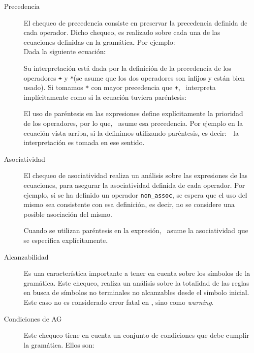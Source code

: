 \begin{description}
\item [Precedencia] El chequeo de precedencia consiste en preservar la precedencia definida de cada operador. Dicho chequeo, es realizado sobre cada una de las ecuaciones definidas en la gramática. Por ejemplo:\\ Dada la siguiente ecuación:

\begin{center}
\end{center}

Su interpretación está dada por la definición de la precedencia de los operadores \texttt{+} y \texttt{*}(se asume que los dos operadores son infijos y están bien usado). Si tomamos \texttt{*} con mayor precedencia que \texttt{+}, \maggen\ interpreta implícitamente como si la ecuación tuviera paréntesis:

\begin{center}
\end{center}

El uso de paréntesis en las expresiones define explícitamente la prioridad de los operadores, por lo que, \maggen\ asume esa precedencia. Por ejemplo en la ecuación vista arriba, si la definimos utilizando paréntesis, es decir:\  
 \ la interpretación es tomada en ese sentido.

\item [Asociatividad] El chequeo de asociatividad realiza un análisis sobre las expresiones de las ecuaciones, para asegurar la asociatividad definida de cada operador. Por ejemplo, si se ha definido un operador \texttt{non\_assoc}, se espera que el uso del mismo sea consistente con esa definición, es decir, no se considere una posible asociación del mismo. 

Cuando se utilizan paréntesis en la expresión, \maggen\ asume la asociatividad que se especifica explícitamente.

\item [Alcanzabilidad] Es una característica importante a tener en cuenta sobre los símbolos de la gramática. Este chequeo, realiza un análisis sobre la totalidad de las reglas en busca de símbolos no terminales no alcanzables desde el símbolo inicial. Este caso no es considerado error fatal en \maggen, sino como \textit{warning}.

\item [Condiciones de AG] Este chequeo tiene en cuenta un conjunto de condiciones que debe cumplir la gramática. Ellos son:


\end{description}
